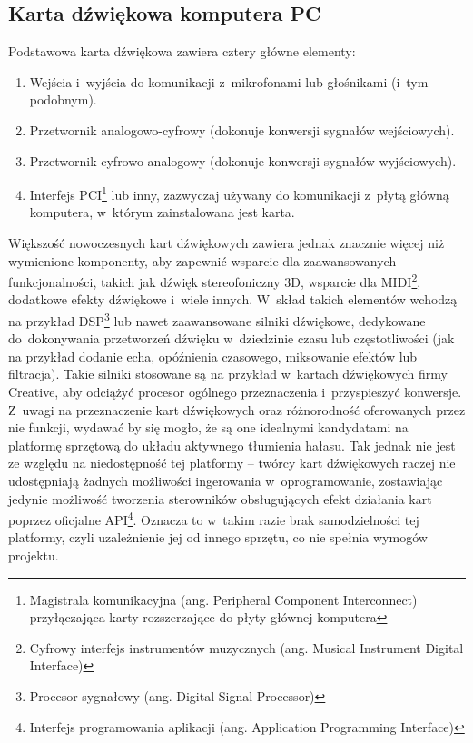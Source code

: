 \subsection{Karta dźwiękowa komputera PC}
\label{soundcard}
Podstawowa karta dźwiękowa zawiera cztery główne elementy:
\begin{enumerate}
	\item Wejścia i~wyjścia do komunikacji z~mikrofonami lub głośnikami (i~tym podobnym).
	\item Przetwornik analogowo-cyfrowy (dokonuje konwersji sygnałów wejściowych).
	\item Przetwornik cyfrowo-analogowy (dokonuje konwersji sygnałów wyjściowych).
	\item Interfejs PCI\footnote{Magistrala komunikacyjna (ang. Peripheral Component Interconnect) przyłączająca karty rozszerzające do płyty głównej komputera} lub inny, zazwyczaj używany do komunikacji z~płytą główną komputera, w~którym zainstalowana jest karta.
\end{enumerate}
Większość nowoczesnych kart dźwiękowych zawiera jednak znacznie więcej niż wymienione komponenty, aby zapewnić wsparcie dla zaawansowanych funkcjonalności, takich jak dźwięk stereofoniczny 3D, wsparcie dla MIDI\footnote{Cyfrowy interfejs instrumentów muzycznych (ang. Musical Instrument Digital Interface)}, dodatkowe efekty dźwiękowe i~wiele innych. W~skład takich elementów wchodzą na przykład DSP\footnote{Procesor sygnałowy (ang. Digital Signal Processor)} lub nawet zaawansowane silniki dźwiękowe, dedykowane do~dokonywania przetworzeń dźwięku w~dziedzinie czasu lub częstotliwości (jak na przykład dodanie echa, opóźnienia czasowego, miksowanie efektów lub filtracja). Takie silniki stosowane są na przykład w~kartach dźwiękowych firmy Creative, aby odciążyć procesor ogólnego przeznaczenia i~przyspieszyć konwersje.\\
Z~uwagi na przeznaczenie kart dźwiękowych oraz różnorodność oferowanych przez nie funkcji, wydawać by się mogło, że są one idealnymi kandydatami na platformę sprzętową do układu aktywnego tłumienia hałasu. Tak jednak nie jest ze względu na niedostępność tej platformy -- twórcy kart dźwiękowych raczej nie udostępniają żadnych możliwości ingerowania w~oprogramowanie, zostawiając jedynie możliwość tworzenia sterowników obsługujących efekt działania kart poprzez oficjalne API\footnote{Interfejs programowania aplikacji (ang. Application Programming Interface)}. Oznacza to w~takim razie brak samodzielności tej platformy, czyli uzależnienie jej od innego sprzętu, co nie spełnia wymogów projektu.
